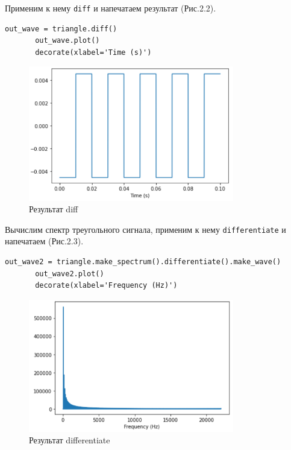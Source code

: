 \documentclass[a4paper,12pt]{report}
\begin{document}
    Применим к нему \texttt{diff} и напечатаем результат (Рис.2.2).
\begin{lstlisting}[caption=Использование diff]
       out_wave = triangle.diff()
       out_wave.plot()
       decorate(xlabel='Time (s)')
\end{lstlisting}
\begin{figure}[H]
        \centering
        \includegraphics[width=0.8\textwidth]{fig2-2.PNG}
        \caption{Результат diff}
        \label{fig:fig2-2}
\end{figure} 

   Вычислим спектр треугольного сигнала, применим к нему \texttt{differentiate} и напечатаем (Рис.2.3).
\begin{lstlisting}[caption=Использование differentiate]
       out_wave2 = triangle.make_spectrum().differentiate().make_wave()
       out_wave2.plot()
       decorate(xlabel='Frequency (Hz)')
\end{lstlisting}
\begin{figure}[H]
        \centering
        \includegraphics[width=0.8\textwidth]{fig2-3.PNG}
        \caption{Результат differentiate}
        \label{fig:fig2-3}
\end{figure}
    
\end{document}
